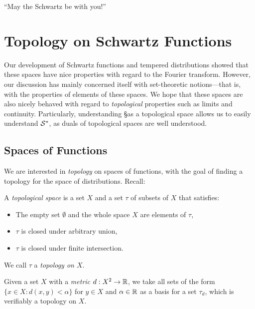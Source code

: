 
  \begin{savequote}
    ``May the Schwartz be with you!''
  \end{savequote}
  \chapter{Topology on Schwartz Functions}
    \label{ch:topons}
    Our development of Schwartz functions and tempered distributions showed that these spaces have nice properties with regard to the Fourier transform.
    However, our discussion has mainly concerned itself with set-theoretic notions---that is, with the properties of elements of these spaces.
    We hope that these spaces are also nicely behaved with regard to \emph{topological} properties such as limits and continuity.
    Particularly, understanding \S as a topological space allows us to easily understand $\S^*$, as duals of topological spaces are well understood.

    \section{Spaces of Functions}
      \label{sec:spcoffunc}
      We are interested in \emph{topology} on spaces of functions, with the goal of finding a topology for the space of distributions.
      Recall:
      \begin{defn}
        A \emph{topological space} is a set $X$ and a set $\tau$ of subsets of $X$ that satisfies:
        \begin{itemize}
          \item The empty set $\emptyset$ and the whole space $X$ are elements of $\tau$,
          \item $\tau$ is closed under arbitrary union,
          \item $\tau$ is closed under finite intersection.
        \end{itemize}
        We call $\tau$ a \emph{topology on $X$}.

        Given a set $X$ with a \emph{metric} $d:X^2\rightarrow\R$, we take all sets of the form $\{x\in X:d(x,y)<\alpha\}$ for $y\in X$ and $\alpha\in\R$ as a basis for a set $\tau_d$, which is verifiably a topology on $X$.
      \end{defn}

